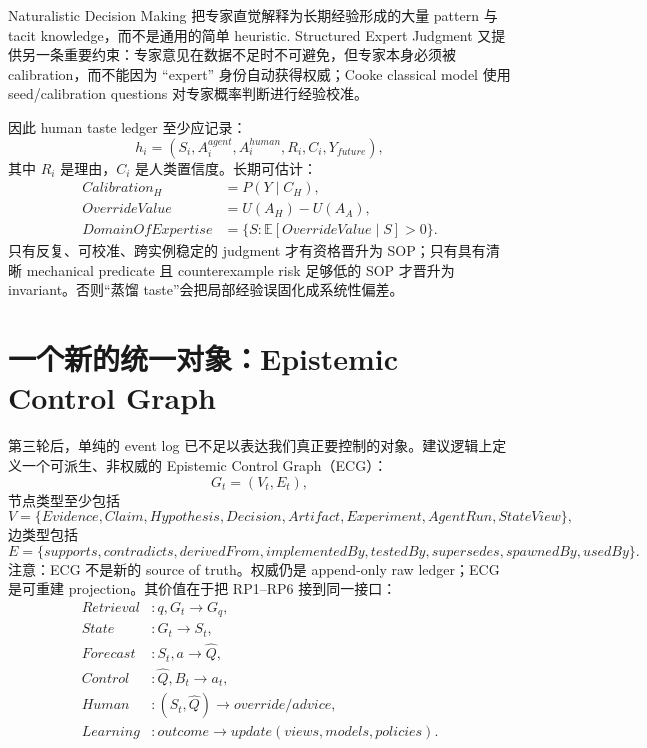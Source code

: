 \documentclass[11pt,a4paper]{ctexart}
\newcommand{\E}{\mathbb{E}}
\begin{document}
Naturalistic Decision Making 把专家直觉解释为长期经验形成的大量 pattern 与 tacit knowledge，而不是通用的简单 heuristic\parencite{klein2015ndm,patterson2010tacit}. Structured Expert Judgment 又提供另一条重要约束：专家意见在数据不足时不可避免，但专家本身必须被 calibration，而不能因为 ``expert'' 身份自动获得权威；Cooke classical model 使用 seed/calibration questions 对专家概率判断进行经验校准\parencite{colson2018expert}。

因此 human taste ledger 至少应记录：
\begin{equation}
h_i=(S_i,A_i^{agent},A_i^{human},R_i,C_i,Y_{future}),
\end{equation}
其中 $R_i$ 是理由，$C_i$ 是人类置信度。长期可估计：
\begin{align}
Calibration_H&=P(Y\mid C_H),\\
OverrideValue&=U(A_H)-U(A_A),\\
DomainOfExpertise&=\{S: \E[OverrideValue\mid S]>0\}.
\end{align}
只有反复、可校准、跨实例稳定的 judgment 才有资格晋升为 SOP；只有具有清晰 mechanical predicate 且 counterexample risk 足够低的 SOP 才晋升为 invariant。否则“蒸馏 taste”会把局部经验误固化成系统性偏差。

\section{一个新的统一对象：Epistemic Control Graph}

第三轮后，单纯的 event log 已不足以表达我们真正要控制的对象。建议逻辑上定义一个可派生、非权威的 Epistemic Control Graph（ECG）：
\begin{equation}
G_t=(V_t,E_t),
\end{equation}
节点类型至少包括
\begin{equation}
V=\{Evidence,Claim,Hypothesis,Decision,Artifact,Experiment,AgentRun,StateView\},
\end{equation}
边类型包括
\begin{equation}
E=\{supports,contradicts,derivedFrom,implementedBy,testedBy,supersedes,spawnedBy,usedBy\}.
\end{equation}
注意：ECG 不是新的 source of truth。权威仍是 append-only raw ledger；ECG 是可重建 projection。其价值在于把 RP1--RP6 接到同一接口：
\begin{align}
Retrieval &: q,G_t\to G_q,\\
State &: G_t\to S_t,\\
Forecast &: S_t,a\to \hat Q,\\
Control &: \hat Q,B_t\to a_t,\\
Human &: (S_t,\hat Q)\to override/advice,\\
Learning &: outcome\to update(views,models,policies).
\end{align}
\end{document}
